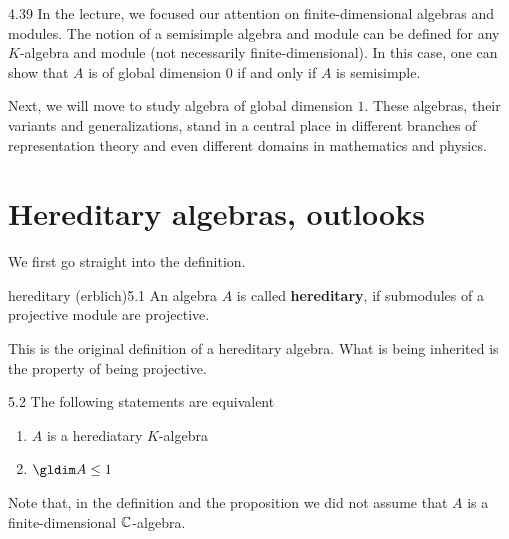 \documentclass[twoside = false,	%
		headsepline,		%
		parskip = true,
		]{scrbook}						%
\begin{document}
    \begin{remark}{}{4.39}
        In the lecture, we focused our attention on finite-dimensional algebras and modules. The notion of a semisimple algebra and module can be defined for any $K$-algebra and module (not necessarily finite-dimensional). In this case, one can show that $A$ is of global dimension $0$ if and only if $A$ is semisimple.
    \end{remark}

    Next, we will move to study algebra of global dimension $1$. These algebras, their variants and generalizations, stand in a central place in different branches of representation theory and even different domains in mathematics and physics.

\chapter{Hereditary algebras, outlooks}
    We first go straight into the definition.
    \begin{definition}{hereditary (erblich)}{5.1}
        An algebra $A$ is called \textbf{hereditary}, if submodules of a projective module are projective.
    \end{definition}

    This is the original definition of a hereditary algebra. What is being inherited is the property of being projective.

    \begin{proposition}{}{5.2}
        The following statements are equivalent
        \begin{enumerate}
            \item $A$ is a herediatary $K$-algebra
            \item $\gldim A \leq 1$
        \end{enumerate}
    \end{proposition}
    Note that, in the definition and the proposition we did not assume that $A$ is a finite-dimensional $\mathbb C$-algebra.
\end{document}
